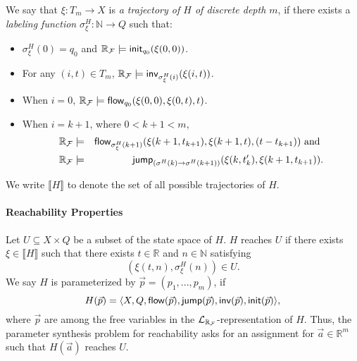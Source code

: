We say that $\xi: T_m\rightarrow X$ is {\em a trajectory of $H$ of discrete depth $m$}, if there
exists a {\em labeling function} $\sigma^H_{\xi}: \mathbb{N}\rightarrow Q$ such
that:
\begin{itemize}
\item $\sigma^H_{\xi}(0) = q_0$ and
$\mathbb{R}_{\mathcal{F}}\models \mathsf{init}_{q_0}(\xi(0,0))$.
\item For any $(i, t)\in T_m$,
$\mathbb{R}_{\mathcal{F}}\models \mathsf{inv}_{\sigma^H_{\xi}(i)} (\xi(i,t))$.
\item When $i=0$, $\mathbb{R}_{\mathcal{F}}\models\mathsf{flow}_{q_0}(\xi(0,0), \xi(0,t), t)$.
\item When $i = k+1$, where $0< k+1 <m$,
\begin{eqnarray*}
\mathbb{R}_{\mathcal{F}}&\models&\mathsf{flow}_{\sigma^H_{\xi}(k+1)}(\xi(k+1, t_{k+1}),
\xi(k+1, t), (t - t_{k+1}))\mbox{ and }\\
\mathbb{R}_{\mathcal{F}}&\models& \mathsf{jump}_{(\sigma^H(k)\rightarrow
\sigma^H(k+1))}(\xi(k, t_k'), \xi(k+1,t_{k+1})).
\end{eqnarray*}
\end{itemize}
We write $\llbracket H\rrbracket$ to denote the set of all possible trajectories
of $H$.

\paragraph{Reachability Properties}
Let $U\subseteq X\times Q$ be a subset of the state space of $H$. $H$ reaches $U$ if there exists $\xi\in \llbracket H\rrbracket$ such that there exists $t\in \mathbb{R}$ and $n\in\mathbb{N}$ satisfying
$$(\xi(t,n), \sigma_{\xi}^{H}(n))\in U.$$
%
We say $H$ is parameterized by $\vec p = (p_1,...,p_m)$, if
$$H(\vec p) = \langle X, Q, \mathsf{flow}(\vec p), \mathsf{jump}(\vec p), \mathsf{inv}(\vec p), \mathsf{init}(\vec p)\rangle,$$
where $\vec p$ are among the free variables in the $\mathcal{L}_{\mathbb{R}_{\mathcal{F}}}$-representation of $H$.
Thus, the parameter synthesis problem for reachability asks for an assignment for $\vec a\in \mathbb{R}^m$ such that $H(\vec a)$ reaches $U$.

